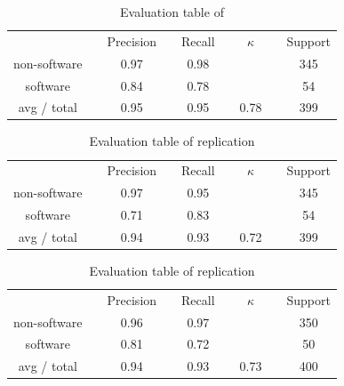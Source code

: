\documentclass[12pt, a4paper, abstract, parskip]{scrartcl}
\newcommand{\ra}[1]{\renewcommand{\arraystretch}{#1}}
\theoremstyle{definition}
\begin{document}
\begin{table}[!hp]\caption{Evaluation table of \cite{bessen2007empirical}}\label{tab:eval_algo_original}\centering\ra{1.3}
\begin{tabular}{@{}cp{0.5cm}cp{0.5cm}cp{0.5cm}cp{0.5cm}c@{}} \toprule
 & & Precision & & Recall & & $\kappa$ & & Support\\ \cline{1-1} \cline{3-3} \cline{5-5} \cline{7-7} \cline{9-9}
non-software & & 0.97 & & 0.98 & &  & & 345\\
software & & 0.84 & & 0.78 & &  & & 54\\ \cline{1-1} \cline{3-3} \cline{5-5} \cline{7-7} \cline{9-9}
avg / total & & 0.95 & & 0.95 & & 0.78 & & 399\\
\bottomrule
\end{tabular}
\end{table}

\begin{table}[!hp]\caption{Evaluation table of replication}\label{tab:eval_algo_rep}\centering\ra{1.3}
\begin{tabular}{@{}cp{0.5cm}cp{0.5cm}cp{0.5cm}cp{0.5cm}c@{}} \toprule
 & & Precision & & Recall & & $\kappa$ & & Support\\ \cline{1-1} \cline{3-3} \cline{5-5} \cline{7-7} \cline{9-9}
non-software & & 0.97 & & 0.95 & &  & & 345\\
software & & 0.71 & & 0.83 & &  & & 54\\ \cline{1-1} \cline{3-3} \cline{5-5} \cline{7-7} \cline{9-9}
avg / total & & 0.94 & & 0.93 & & 0.72 & & 399\\
\bottomrule
\end{tabular}
\end{table}

\newpage

\begin{table}[!hp]\caption{Evaluation table of replication}\label{tab:eval_machine_learning}\centering\ra{1.3}
\begin{tabular}{@{}cp{0.5cm}cp{0.5cm}cp{0.5cm}cp{0.5cm}c@{}} \toprule
 & & Precision & & Recall & & $\kappa$ & & Support\\ \cline{1-1} \cline{3-3} \cline{5-5} \cline{7-7} \cline{9-9}
non-software & & 0.96 & & 0.97 & &  & & 350\\
software & & 0.81 & & 0.72 & &  & & 50\\ \cline{1-1} \cline{3-3} \cline{5-5} \cline{7-7} \cline{9-9}
avg / total & & 0.94 & & 0.93 & & 0.73 & & 400\\
\bottomrule
\end{tabular}
\end{table}
\end{document}
